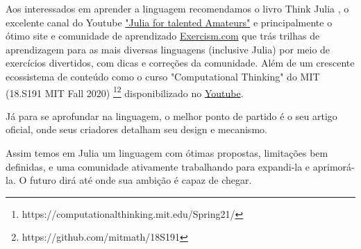 Aos interessados em aprender a linguagem recomendamos o livro Think Julia \cite{Lauwens2019}, o excelente canal do Youtube \href{https://www.youtube.com/c/juliafortalentedamateurs}{"Julia for talented Amateurs"} e principalmente o ótimo site e comunidade de aprendizado \href{https://exercism.org/tracks/julia}{Exercism.com} que trás trilhas de aprendizagem para as mais diversas linguagens (inclusive Julia) por meio de exercícios divertidos, com dicas e correções da comunidade. Além de um crescente ecossistema de conteúdo como o curso "Computational Thinking" do MIT (18.S191 MIT Fall 2020) \footnote{https://computationalthinking.mit.edu/Spring21/}\footnote{https://github.com/mitmath/18S191} disponibilizado no \href{https://www.youtube.com/playlist?list=PLP8iPy9hna6Q2Kr16aWPOKE0dz9OnsnIJ}{Youtube}.

Já para se aprofundar na linguagem, o melhor ponto de partido é o seu artigo oficial, onde seus criadores detalham seu design e mecanismo. \cite{Bezanson2017}

Assim temos em Julia um linguagem com ótimas propostas, limitações bem definidas, e uma comunidade ativamente trabalhando para expandi-la e aprimorá-la. O futuro dirá até onde sua ambição é capaz de chegar. 
